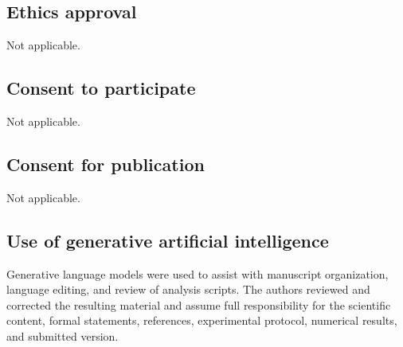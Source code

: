 \documentclass[pdflatex,sn-mathphys-num,iicol,oneside]{sn-jnl}
\begin{document}
\subsection*{Ethics approval}

Not applicable.

\subsection*{Consent to participate}

Not applicable.

\subsection*{Consent for publication}

Not applicable.

\subsection*{Use of generative artificial intelligence}

Generative language models were used to assist with manuscript
organization, language editing, and review of analysis scripts. The
authors reviewed and corrected the resulting material and assume full
responsibility for the scientific content, formal statements,
references, experimental protocol, numerical results, and submitted
version.


\end{document}

